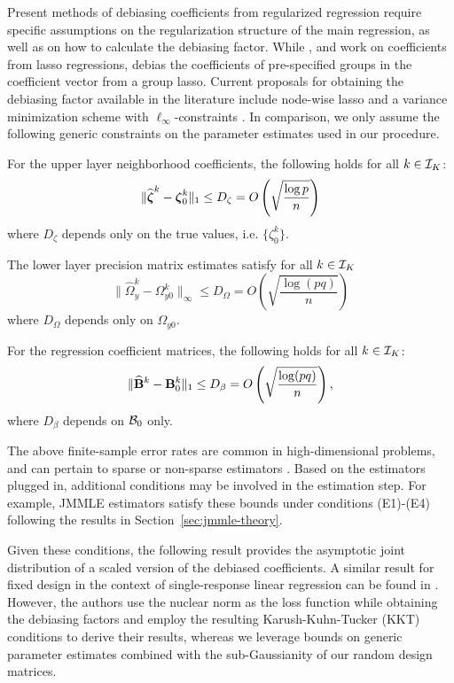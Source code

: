 Present methods of debiasing coefficients from regularized regression require specific assumptions on the regularization structure of the main regression, as well as on how to calculate the debiasing factor. While \citet{ZhangZhang14}, \citet{JavanmardMontanari14} and \citet{vanDeGeerEtal14} work on coefficients from lasso regressions, \citet{MitraZhang16} debias the coefficients of pre-specified groups in the coefficient vector from a group lasso. Current proposals for obtaining the debiasing factor available in the literature include node-wise lasso \citep{ZhangZhang14} and a variance minimization scheme with $\ell_\infty$-constraints \citep{JavanmardMontanari14}. In comparison, we only assume the following generic constraints on the parameter estimates used in our procedure.

\vspace{1em}
 For the upper layer neighborhood coefficients, the following holds for all $k \in {\cal{I}}_K$:
%
$$
\| \widehat {{\boldsymbol{\zeta}}}^k - {\boldsymbol{\zeta}}_0^k \|_1 \leq D_\zeta  = O \left( \sqrt { \frac{\log p}{n}} \right)
$$
%
where $D_\zeta$ depends only on the true values, i.e. $\{ \zeta^k_0 \}$.

 The lower layer precision matrix estimates satisfy for all $k \in {\cal{I}}_K$
%
$$
\| \widehat \Omega_y^k - \Omega_{y0}^k \|_\infty \leq D_\Omega
= O \left( \sqrt { \frac{\log (pq)}{n}} \right)$$
%
where $D_\Omega$ depends only on $\Omega_{y 0}$.

 For the regression coefficient matrices, the following holds for all $k \in {\cal{I}}_K$:
%
$$
\| \widehat {{\mathbf{B}}}^k - {\mathbf{B}}^k_0 \|_1 \leq D_\beta = O \left( \sqrt { \frac{\log (p q)}{n}} \right),
$$
%
where $D_\beta$ depends on ${\cal{B}}_0$ only.
\vspace{1em}

\noindent
The above finite-sample error rates are common in high-dimensional problems, and can pertain to sparse \citep{MaMichailidis15,LinEtal16,LohWainwright12,BasuMichailidis15} or non-sparse estimators \citep{RohdeTsybakov11,BasuEtal19}. Based on the estimators plugged in, additional conditions may be involved in the estimation step. For example, JMMLE estimators satisfy these bounds under conditions (E1)-(E4) following the results in Section~\ref{sec:jmmle-theory}.

Given these conditions, the following result provides the asymptotic joint distribution of a scaled version of the debiased coefficients. A similar result for fixed design in the context of single-response linear regression can be found in \citet{StuckyVandeGeer17}. However, the authors use the nuclear norm as the loss function while obtaining the debiasing factors and employ the resulting Karush-Kuhn-Tucker (KKT) conditions to derive their results, whereas we leverage bounds on generic parameter estimates combined with the sub-Gaussianity of our random design matrices.

